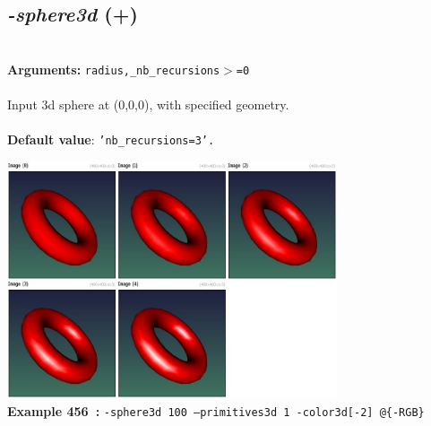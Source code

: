 \documentclass[a4paper,11pt,twoside]{book}
\begin{document}
\subsection{\emph{-sphere3d} (+)}\vspace*{-0.5em}
~\\\textbf{Arguments: } 
{\small \texttt{radius,\_nb\_recursions$>$=0}}\\~\\
Input 3d sphere at (0,0,0), with specified geometry.
~\\~\\\textbf{Default value}: {\small \texttt{'nb\_recursions=3'.}}
\begin{center}\includegraphics[keepaspectratio=true,height=7cm,width=\textwidth]{img/gmic_def456.jpg}\\
{\footnotesize \textbf{Example 456~:} \texttt{-sphere3d 100 --primitives3d 1  -color3d[-2] @\{-RGB\}}}
\end{center}
\end{document}
